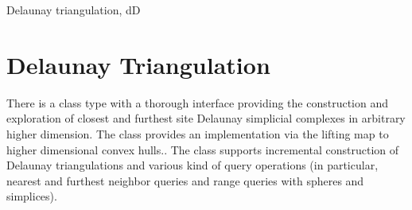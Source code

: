 \begin{ccPackage}{Delaunay triangulation, dD}
\section{Delaunay Triangulation}
  
There is a class type with a thorough interface providing the
construction and exploration of closest and furthest site Delaunay
simplicial complexes in arbitrary higher dimension.  The class
 provides an
implementation via the lifting map to higher dimensional
convex hulls..
The class supports incremental construction of Delaunay triangulations 
and various kind of query operations (in particular, nearest and furthest
neighbor queries and range queries with spheres and simplices).

\end{ccPackage}

